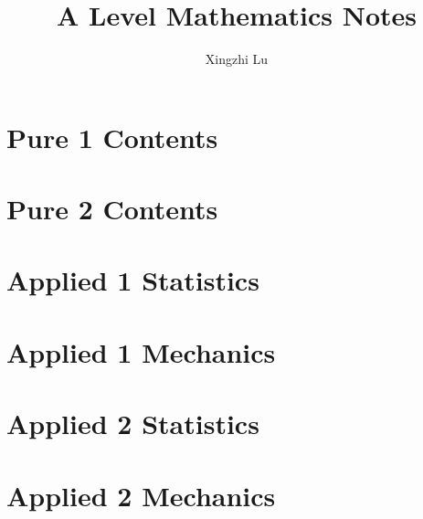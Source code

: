 \documentclass[oneside,fleqn,11pt]{book}
\title{A Level Mathematics Notes}
\author{Xingzhi Lu}
\date{}
\begin{document}
\everymath{\displaystyle}
\maketitle
\tableofcontents

\part{Pure 1 Contents}


\part{Pure 2 Contents}
\setcounter{chapter}{0}


\part{Applied 1 Statistics}
\setcounter{chapter}{0}


\part{Applied 1 Mechanics}
\setcounter{chapter}{7}


\part{Applied 2 Statistics}
\setcounter{chapter}{0}


\part{Applied 2 Mechanics}
\setcounter{chapter}{3}

\end{document}
